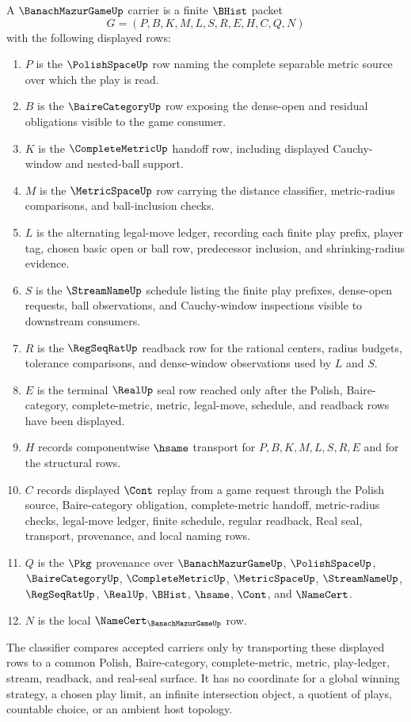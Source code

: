 \begin{definition}
\label{def:banach-mazur-game-carrier}
A $\BanachMazurGameUp$ carrier is a finite $\BHist$ packet
$$
G=(P,B,K,M,L,S,R,E,H,C,Q,N)
$$
with the following displayed rows:
\begin{enumerate}
\item $P$ is the $\PolishSpaceUp$ row naming the complete separable metric source over which the play is read.
\item $B$ is the $\BaireCategoryUp$ row exposing the dense-open and residual obligations visible to the game consumer.
\item $K$ is the $\CompleteMetricUp$ handoff row, including displayed Cauchy-window and nested-ball support.
\item $M$ is the $\MetricSpaceUp$ row carrying the distance classifier, metric-radius comparisons, and ball-inclusion checks.
\item $L$ is the alternating legal-move ledger, recording each finite play prefix, player tag, chosen basic open or ball row, predecessor inclusion, and shrinking-radius evidence.
\item $S$ is the $\StreamNameUp$ schedule listing the finite play prefixes, dense-open requests, ball observations, and Cauchy-window inspections visible to downstream consumers.
\item $R$ is the $\RegSeqRatUp$ readback row for the rational centers, radius budgets, tolerance comparisons, and dense-window observations used by $L$ and $S$.
\item $E$ is the terminal $\RealUp$ seal row reached only after the Polish, Baire-category, complete-metric, metric, legal-move, schedule, and readback rows have been displayed.
\item $H$ records componentwise $\hsame$ transport for $P,B,K,M,L,S,R,E$ and for the structural rows.
\item $C$ records displayed $\Cont$ replay from a game request through the Polish source, Baire-category obligation, complete-metric handoff, metric-radius checks, legal-move ledger, finite schedule, regular readback, Real seal, transport, provenance, and local naming rows.
\item $Q$ is the $\Pkg$ provenance over $\BanachMazurGameUp$, $\PolishSpaceUp$, $\BaireCategoryUp$, $\CompleteMetricUp$, $\MetricSpaceUp$, $\StreamNameUp$, $\RegSeqRatUp$, $\RealUp$, $\BHist$, $\hsame$, $\Cont$, and $\NameCert$.
\item $N$ is the local $\NameCert_{\BanachMazurGameUp}$ row.
\end{enumerate}
The classifier compares accepted carriers only by transporting these displayed rows to a common Polish, Baire-category, complete-metric, metric, play-ledger, stream, readback, and real-seal surface. It has no coordinate for a global winning strategy, a chosen play limit, an infinite intersection object, a quotient of plays, countable choice, or an ambient host topology.
\end{definition}


